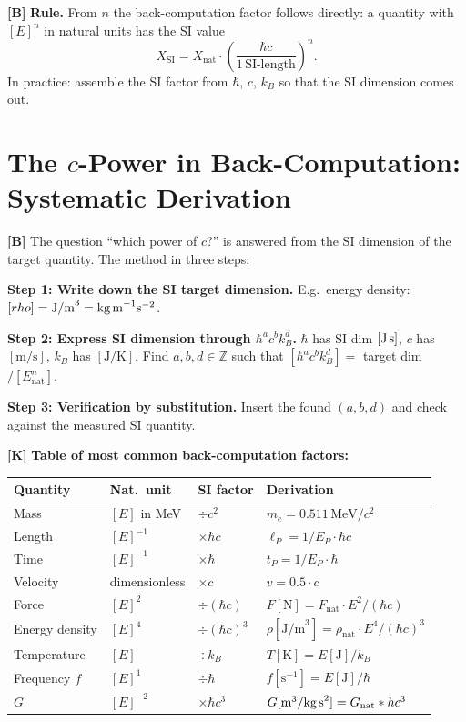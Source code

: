 \textbf{[B]} \textbf{Rule.} From $n$ the back-computation factor follows
directly: a quantity with $[E]^n$ in natural units has the SI value
\[
  X_\text{SI} = X_\text{nat}\cdot\left(\frac{\hbar c}{1\,\text{SI-length}}\right)^n.
\]
In practice: assemble the SI factor from $\hbar$, $c$, $k_B$ so that the SI
dimension comes out.

\section{The $c$-Power in Back-Computation: Systematic Derivation}

\textbf{[B]} The question ``which power of $c$?'' is answered from the SI
dimension of the target quantity. The method in three steps:

\textbf{Step 1: Write down the SI target dimension.}
E.g.\ energy density: $[\rho]=\text{J/m}^3=\text{kg\,m}^{-1}\text{s}^{-2}$.

\textbf{Step 2: Express SI dimension through $\hbar^a c^b k_B^d$.}
$\hbar$ has SI dim $[\text{J\,s}]$, $c$ has $[\text{m/s}]$, $k_B$ has $[\text{J/K}]$.
Find $a,b,d\in\mathbb Z$ such that $[\hbar^a c^b k_B^d]=$ target dim$/[E_\text{nat}^n]$.

\textbf{Step 3: Verification by substitution.}
Insert the found $(a,b,d)$ and check against the measured SI quantity.

\textbf{[K]} \textbf{Table of most common back-computation factors:}

\begin{center}
\renewcommand{\arraystretch}{1.35}
{\small\setlength\tabcolsep{4pt}
\begin{tabular}{lllp{4.5cm}}
\toprule
Quantity & Nat.\ unit & SI factor & Derivation \\
\midrule
Mass & $[E]$ in MeV & $\div c^2$ & $m_e=0{.}511\,\text{MeV}/c^2$ \\
Length & $[E]^{-1}$ & $\times\hbar c$ & $\ell_P=1/E_P\cdot\hbar c$ \\
Time & $[E]^{-1}$ & $\times\hbar$ & $t_P=1/E_P\cdot\hbar$ \\
Velocity & dimensionless & $\times c$ & $v=0{.}5\cdot c$ \\
Force & $[E]^2$ & $\div(\hbar c)$ & $F[\text{N}]=F_\text{nat}\cdot E^2/(\hbar c)$ \\
Energy density & $[E]^4$ & $\div(\hbar c)^3$ & $\rho[\text{J/m}^3]=\rho_\text{nat}\cdot E^4/(\hbar c)^3$ \\
Temperature & $[E]$ & $\div k_B$ & $T[\text{K}]=E[\text{J}]/k_B$ \\
Frequency $f$ & $[E]^1$ & $\div\hbar$ & $f[\text{s}^{-1}]=E[\text{J}]/\hbar$ \\
$G$ & $[E]^{-2}$ & $\times\hbar c^3$ & $G[\text{m}^3/\text{kg\,s}^2]=G_\text{nat}\cdot\hbar c^3$ \\
\bottomrule
\end{tabular}
}
\renewcommand{\arraystretch}{1.0}
\end{center}

